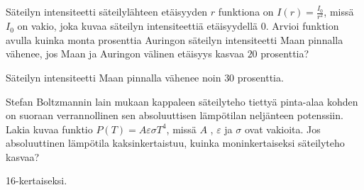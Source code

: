 \begin{tehtavasivu}
\begin{tehtava}
Säteilyn intensiteetti säteilylähteen etäisyyden $ r $ funktiona on $ I(r)=\frac{I_{0}}{r^{2}}$, missä $I_{0}$ on vakio, joka kuvaa säteilyn intensiteettiä etäisyydellä $ 0 $. Arvioi funktion avulla kuinka monta prosenttia Auringon säteilyn intensiteetti Maan pinnalla vähenee, jos Maan ja Auringon välinen etäisyys kasvaa $ 20 $ prosenttia?
\begin{vastaus}
Säteilyn intensiteetti Maan pinnalla vähenee noin $ 30 $ prosenttia.
\end{vastaus}
\end{tehtava}

\begin{tehtava}
Stefan Boltzmannin lain mukaan kappaleen säteilyteho tiettyä pinta-alaa kohden on suoraan verrannollinen sen absoluuttisen lämpötilan neljänteen potenssiin. Lakia kuvaa funktio $ P(T)=A\varepsilon\sigma T^{4} $, missä $ A$ , $\varepsilon$ ja $\sigma $ ovat vakioita.  Jos absoluuttinen lämpötila kaksinkertaistuu, kuinka moninkertaiseksi säteilyteho kasvaa?
\begin{vastaus}
16-kertaiseksi.
\end{vastaus}
\end{tehtava}

\end{tehtavasivu}
